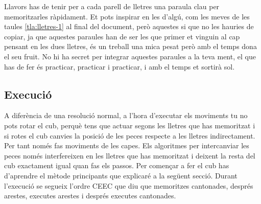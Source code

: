 Llavors has de tenir per a cada parell de lletres una paraula clau per memoritzarles ràpidament. Et pots inspirar en les d'algú, com les meves de les taules \ref{tla:lletres-1} al final del document, però aquestes si que no les hauries de copiar, ja que aquestes paraules han de ser les que primer et vinguin al cap pensant en les dues lletres, és un treball una mica pesat però amb el temps dona el seu fruit.
No hi ha secret per integrar aquestes paraules a la teva ment, el que has de fer és practicar, practicar i practicar, i amb el temps et sortirà sol.

\subsection{Execució}

A diferència de una resolució normal, a l'hora d'executar els moviments tu no pots rotar el cub, perquè tens que actuar segons les lletres que has memoritzat i si rotes el cub canvies la posició de les peces respecte a les lletres indirectament. 
Per tant només fas moviments de les capes. Els algoritmes per intercanviar les peces només interfereixen en les lletres que has memoritzat i deixent la resta del cub exactament igual quan fas els passos. Per començar a fer el cub has d'aprendre el mètode principants que explicaré a la següent secció.
Durant l'execució se segueix l'ordre CEEC que diu que memoritzes cantonades, després arestes, executes arestes i després executes cantonades.
